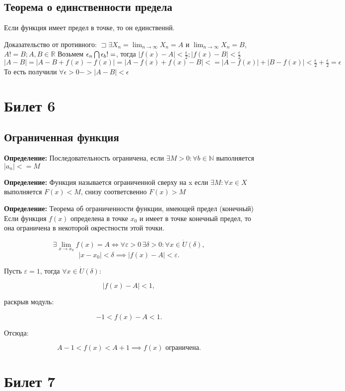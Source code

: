 \documentclass{article}
\begin{document}
\subsection{Теорема о единственности предела} 
Если функция имеет предел в точке, то он единственнй.

Доказательство от противного:
$\sqsupset \exists {X_n} = \lim _{n \to \infty}{X_n} = A$ и $\lim _{n \to \infty}{X_n} = B$, $A != B; A,B \in \mathds{R}$
Возьмем $\epsilon_n \bigcap \epsilon_b != \empty$, тогда $|f(x) - A| < \frac{\epsilon}{2}; |f(x) - B| < \frac{\epsilon}{2}$
$|A-B| = |A-B+f(x)-f(x)| = |A-f(x)+f(x)-B| <= |A-f(x)| + |B-f(x)| < \frac{\epsilon}{2} + \frac{\epsilon}{2} = \epsilon$
То есть получили $\forall \epsilon > 0 -> |A-B| < \epsilon$

\section{Билет 6}

\subsection{Ограниченная функция}

\textbf{Определение:} Последовательность ограничена, если $\exists M > 0 : \forall b \in \mathds{N}$ выполняется $|a_n| <= M$

\textbf{Определение:} Функция называется ограниченной сверху на x если $\exists M : \forall x \in X$ выполняется $F(x)<M$, снизу соответсвенно $F(x)>M$

\textbf{Определение:} Теорема об ограниченности функции, имеющей предел (конечный)
Если функция $f(x)$ определена в точке $x_0$ и имеет в точке конечный предел, то она ограничена в некоторой окрестности этой точки.

\[
\exists \lim_{x \to x_0} f(x) = A \iff \forall \varepsilon > 0 \, \exists \delta > 0 : \forall x \in \dot{U}(\delta),
\]
\[
|x - x_0| < \delta \implies |f(x) - A| < \varepsilon.
\]

Пусть $\varepsilon = 1$, тогда $\forall x \in \dot{U}(\delta)$:

\[
|f(x) - A| < 1,
\]

раскрыв модуль:

\[
-1 < f(x) - A < 1.
\]

Отсюда:

\[
A - 1 < f(x) < A + 1 \implies f(x) \text{ ограничена}.
\]

\section{Билет 7}
\end{document}
